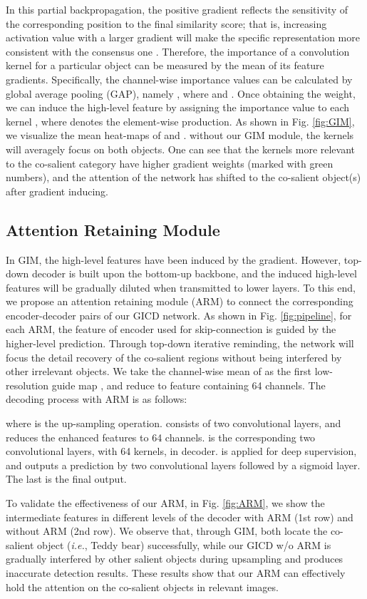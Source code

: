 \documentclass[runningheads,orivec]{llncs}
\newcommand{\figref}[1]{Fig. \ref{#1}}
\def\ie{\emph{i.e.}}
\begin{document}
In this partial backpropagation, the positive gradient  reflects the sensitivity of the corresponding position to the final similarity score; 
that is, increasing activation value with a larger gradient will make the specific representation  more consistent with the consensus one .
Therefore, the importance of a convolution kernel for a particular object can be measured by the mean of its feature gradients.
Specifically, the channel-wise importance values can be calculated by global average pooling (GAP), namely , where  and .
Once obtaining the weight, we can induce the high-level feature  by assigning the importance value to each kernel , where  denotes the element-wise production.
As shown in \figref{fig:GIM}, we visualize the mean heat-maps of  and .
without our GIM module, the kernels will averagely focus on both objects.
One can see that the kernels more relevant to the co-salient category have higher gradient weights (marked with green numbers), and the attention of the network has shifted to the co-salient object(s) after gradient inducing.


\subsection{Attention Retaining Module}
In GIM, the high-level features have been induced by the gradient.
However, top-down decoder is built upon the bottom-up backbone, and the induced high-level features will be gradually diluted when transmitted to lower layers.
To this end, we propose an attention retaining module (ARM) to connect the corresponding encoder-decoder pairs of our GICD network.
As shown in \figref{fig:pipeline}, for each ARM, the feature of encoder used for skip-connection is guided by the higher-level prediction.
Through top-down iterative reminding,
the network will focus the detail recovery of the co-salient regions without being interfered by other irrelevant objects.
We take the channel-wise mean of  as the first low-resolution guide map ,
and reduce  to feature  containing 64 channels.
The decoding process with ARM is as follows:

where  is the up-sampling operation.
 consists of two convolutional layers, and reduces the enhanced features  to 64 channels.
 is the corresponding two convolutional layers, with 64 kernels, in decoder.
 is applied for deep supervision, and outputs a prediction by two convolutional layers followed by a sigmoid layer.
The last  is the final output.

To validate the effectiveness of our ARM, in \figref{fig:ARM}, we show the intermediate features in different levels of the decoder with ARM (1st row) and without ARM (2nd row).
We observe that, through GIM, both locate the co-salient object (\ie, Teddy bear) successfully, while our GICD w/o ARM is gradually interfered by other salient objects during upsampling and produces inaccurate detection results.
These results show that our ARM can effectively hold the attention on the co-salient objects in relevant images.
\end{document}
